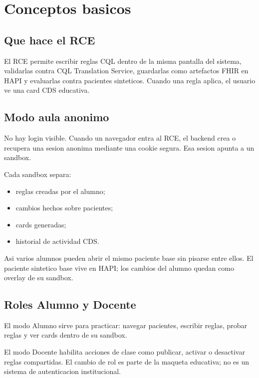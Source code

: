 \section{Conceptos basicos}

\subsection{Que hace el RCE}

El RCE permite escribir reglas CQL dentro de la misma pantalla del sistema,
validarlas contra CQL Translation Service, guardarlas como artefactos FHIR en
HAPI y evaluarlas contra pacientes sinteticos. Cuando una regla aplica, el
usuario ve una card CDS educativa.

\subsection{Modo aula anonimo}

No hay login visible. Cuando un navegador entra al RCE, el backend crea o
recupera una sesion anonima mediante una cookie segura. Esa sesion apunta a un
sandbox.

Cada sandbox separa:

\begin{itemize}
  \item reglas creadas por el alumno;
  \item cambios hechos sobre pacientes;
  \item cards generadas;
  \item historial de actividad CDS.
\end{itemize}

Asi varios alumnos pueden abrir el mismo paciente base sin pisarse entre ellos.
El paciente sintetico base vive en HAPI; los cambios del alumno quedan como
overlay de su sandbox.

\subsection{Roles Alumno y Docente}

El modo Alumno sirve para practicar: navegar pacientes, escribir reglas, probar
reglas y ver cards dentro de su sandbox.

El modo Docente habilita acciones de clase como publicar, activar o desactivar
reglas compartidas. El cambio de rol es parte de la maqueta educativa; no es un
sistema de autenticacion institucional.


